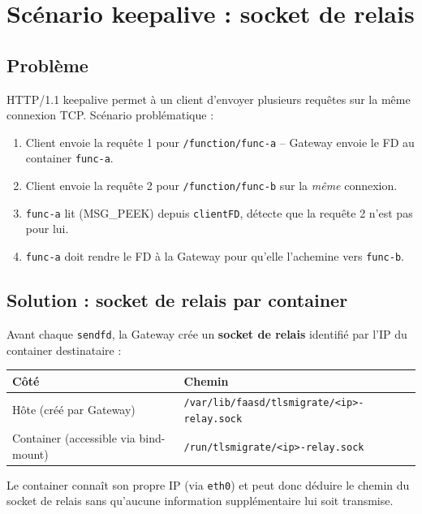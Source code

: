 \documentclass[11pt,a4paper]{article}
\begin{document}
\section{Scénario keepalive : socket de relais}

\subsection{Problème}

HTTP/1.1 keepalive permet à un client d'envoyer plusieurs requêtes sur la même connexion TCP.
Scénario problématique :
\begin{enumerate}
  \item Client envoie la requête 1 pour \texttt{/function/func-a} -- Gateway envoie le FD
    au container \texttt{func-a}.
  \item Client envoie la requête 2 pour \texttt{/function/func-b} sur la \emph{même} connexion.
  \item \texttt{func-a} lit (MSG\_PEEK) depuis \texttt{clientFD}, détecte que la requête 2
    n'est pas pour lui.
  \item \texttt{func-a} doit rendre le FD à la Gateway pour qu'elle l'achemine vers
    \texttt{func-b}.
\end{enumerate}

\subsection{Solution : socket de relais par container}

Avant chaque \texttt{sendfd}, la Gateway crée un \textbf{socket de relais} identifié par l'IP
du container destinataire :

\begin{center}
\begin{tabular}{ll}
\toprule
\textbf{Côté} & \textbf{Chemin} \\
\midrule
Hôte (créé par Gateway) & \texttt{/var/lib/faasd/tlsmigrate/<ip>-relay.sock} \\
Container (accessible via bind-mount) & \texttt{/run/tlsmigrate/<ip>-relay.sock} \\
\bottomrule
\end{tabular}
\end{center}

Le container connaît son propre IP (via \texttt{eth0}) et peut donc déduire le chemin du socket
de relais sans qu'aucune information supplémentaire lui soit transmise.
\end{document}
